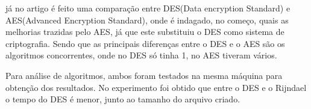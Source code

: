 já no artigo \cite{ribeiro2001estudo} é feito uma comparação entre DES(Data encryption Standard) e AES(Advanced Encryption Standard), onde é indagado, no começo, quais as melhorias trazidas pelo AES, já que este substituiu o DES como sistema de criptografia. Sendo que as principais diferenças entre o DES e o AES são os algoritmos concorrentes, onde no DES só tinha 1, no AES tiveram vários.

Para análise de algoritmos, ambos foram testados na mesma máquina para obtenção dos resultados. No experimento foi obtido que entre o DES e o Rijndael o tempo do DES é menor, junto ao tamanho do arquivo criado.
